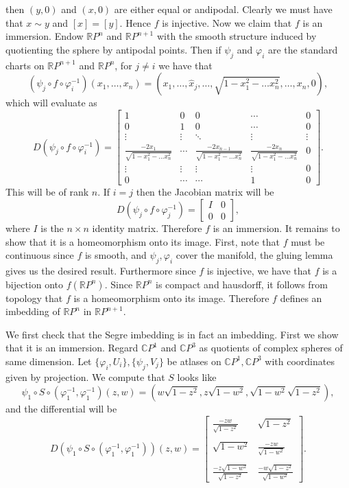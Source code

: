 \documentclass[12pt, a4paper]{article}
\theoremstyle{definition}
\newcommand{\R}{\mathbb{R}}                           %
\newcommand{\C}{\mathbb{C}}                           %
\newcommand{\vph}{\varphi}
\begin{document}
then $(y,0)$ and $(x,0)$ are either equal or andipodal. Clearly we must have that $x\sim y$ and $[x] = [y]$. Hence $f$ is injective. Now we claim that $f$ is an immersion. Endow $\R P^n$ and $\R P^{n+1}$ with the smooth structure induced by quotienting the sphere by antipodal points. Then if $\psi_j$ and $\vph_i$ are the standard charts on $\R P^{n+1}$ and $\R P^n$, for $j \neq i$ we have that $$(\psi_j \circ f \circ \vph_i^{-1})(x_1 , \dots , x_n) =(x_1,  \dots ,\hat{x}_j , \dots , \sqrt{1- x_1^2 - \dots x_n^2}, \dots , x_n, 0  ) ,$$ which will evaluate as $$D(\psi_j \circ f \circ \vph_i^{-1}) = \begin{bmatrix}
	1 & 0 & 0 & \cdots &0
	\\ 0 & 1 & 0 & \cdots& 0
	\\ \vdots & \vdots & \ddots & \vdots & \vdots 
	\\ \frac{-2x_1}{\sqrt{1- x_1^2 - \dots x_n^2}} & \cdots &\frac{-2x_{n-1}}{\sqrt{1- x_1^2 - \dots x_n^2}} & \frac{-2x_n}{\sqrt{1- x_1^2 - \dots x_n^2}}&0 
	\\ \vdots & \vdots & \vdots & \vdots & 0 
	\\ 0 & \cdots & \cdots & 1 & 0
\end{bmatrix}.$$ This will be of rank $n$. If $i=j$ then the Jacobian matrix will be $$D(\psi_j \circ f \circ \vph_j^{-1}) = \begin{bmatrix}
I & 0 \\ 0 & 0 
\end{bmatrix},$$ where $I$ is the $n\times n$ identity matrix. 
Therefore $f$ is an immersion. It remains to show that it is a homeomorphism onto its image. First, note that $f$ must be continuous since $f$ is smooth, and $\psi_j,\vph_i$ cover the manifold, the gluing lemma gives us the desired result. Furthermore since $f$ is injective, we have that $f$ is a bijection onto $f(\R P^n)$. Since $\R P^n$ is compact and hausdorff, it follows from topology that $f$ is a homeomorphism onto its image. Therefore $f$ defines an imbedding of $\R P^n$ in $\R P^{n+1}$.
\item We first check that the Segre imbedding is in fact an imbedding. First we show that it is an immersion. Regard $\C P^1$ and $\C P^3$ as quotients of complex spheres of same dimension. Let $\{\vph_i , U_i\}, \{\psi_j , V_j\}$ be atlases on $\C P^1, \C P^3$ with coordinates given by projection. We compute that $S$ looks like $$\psi_1 \circ S \circ (\vph_1^{-1}, \vph_1^{-1}) (z,w)  = (w\sqrt{1-z^2}, z\sqrt{1-w^2}, \sqrt{1-w^2}\sqrt{1-z^2}),$$ and the differential will be $$D(\psi_1 \circ S \circ (\vph_1^{-1}, \vph_1^{-1})) (z,w) = \begin{bmatrix}
	\frac{-zw}{\sqrt{1-z^2}} & \sqrt{1-z^2} \\ 
	\\
	\sqrt{1-w^2} & \frac{-zw}{\sqrt{1-w^2}} \\
	\\  
	\frac{-z\sqrt{1-w^2}}{\sqrt{1-z^2}} & \frac{-w\sqrt{1-z^2}}{\sqrt{1-w^2}}
\end{bmatrix}.$$
\end{document}
